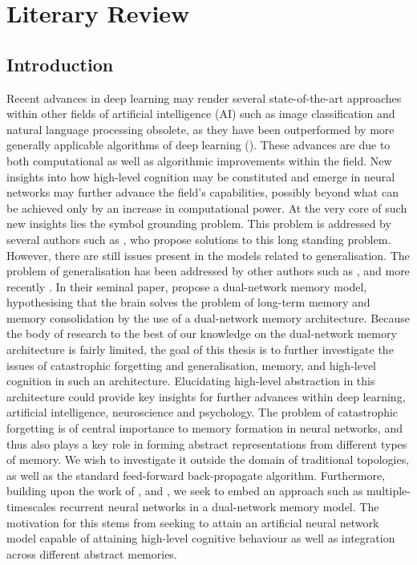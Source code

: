 
\chapter{Literary Review}
\section{Introduction}

Recent advances in deep learning may render several state-of-the-art approaches within other fields of artificial intelligence (AI) such as image classification and natural language processing obsolete, as they have been outperformed by more generally applicable algorithms of deep learning (\cite{LeCun2015, Schmidhuber2014}). These advances are due to both computational as well as algorithmic improvements within the field. New insights into how high-level cognition may be constituted and emerge in neural networks may further advance the field's capabilities, possibly beyond what can be achieved only by an increase in computational power. At the very core of such new insights lies the symbol grounding problem. This problem is addressed by several authors such as \cite{Yamashita2008, Tani2014}, who propose solutions to this long standing problem. However, there are still issues present in the models related to generalisation. The problem of generalisation has been addressed by other authors such as \cite{McClelland1995}, and more recently \cite{Hattori2014}. In their seminal paper, \cite{McClelland1995} propose a dual-network memory model, hypothesising that the brain solves the problem of long-term memory and memory consolidation by the use of a dual-network memory architecture. Because the body of research to the best of our knowledge on the dual-network memory architecture is fairly limited, the goal of this thesis is to further investigate the issues of catastrophic forgetting and generalisation, memory, and high-level cognition in such an architecture. Elucidating high-level abstraction in this architecture could provide key insights for further advances within deep learning, artificial intelligence, neuroscience and psychology. The problem of catastrophic forgetting is of central importance to memory formation in neural networks, and thus also plays a key role in forming abstract representations from different types of memory. We wish to investigate it outside the domain of traditional topologies, as well as the standard feed-forward back-propagate algorithm. Furthermore, building upon the work of \cite{Hattori2014}, and \cite{Yamashita2008}, we seek to embed an approach such as multiple-timescales recurrent neural networks in a dual-network memory model. The motivation for this stems from seeking to attain an artificial neural network model capable of attaining high-level cognitive behaviour as well as integration across different abstract memories.

